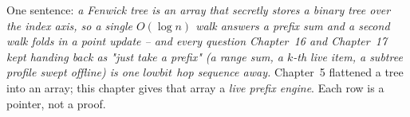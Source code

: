 

One sentence: \emph{a Fenwick tree is an array that secretly stores a binary
tree over the index axis, so a single \(O(\log n)\) walk answers a prefix sum
and a second walk folds in a point update -- and every question Chapter~16 and
Chapter~17 kept handing back as "just take a prefix" (a range sum, a \(k\)-th
live item, a subtree profile swept offline) is one \(\mathit{lowbit}\) hop
sequence away.} Chapter~5 flattened a tree into an array; this chapter gives
that array a \emph{live prefix engine}. Each row is a pointer, not a proof.

